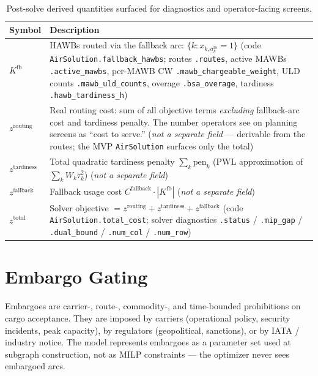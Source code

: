 \documentclass[11pt,a4paper]{article}
\theoremstyle{definition}
\begin{document}
\begin{table}[H]
\centering
\caption{Post-solve derived quantities surfaced for diagnostics and operator-facing screens.}
\label{tab:post-solve-derived}
\begin{tabular}{lp{11.5cm}}
\toprule
Symbol & Description \\
\midrule
$K^{\text{fb}}$ & HAWBs routed via the fallback arc: $\{k : x_{k, a^{\text{fb}}_k} = 1\}$ (code \texttt{AirSolution.fallback\_hawbs}; routes \texttt{.routes}, active MAWBs \texttt{.active\_mawbs}, per-MAWB CW \texttt{.mawb\_chargeable\_weight}, ULD counts \texttt{.mawb\_uld\_counts}, overage \texttt{.bsa\_overage}, tardiness \texttt{.hawb\_tardiness\_h}) \\
$z^{\text{routing}}$ & Real routing cost: sum of all objective terms \emph{excluding} fallback-arc cost and tardiness penalty. The number operators see on planning screens as ``cost to serve.'' (\emph{not a separate field} --- derivable from the routes; the MVP \texttt{AirSolution} surfaces only the total) \\
$z^{\text{tardiness}}$ & Total quadratic tardiness penalty $\sum_k \text{pen}_k$ (PWL approximation of $\sum_k W_k \tau_k^2$) (\emph{not a separate field}) \\
$z^{\text{fallback}}$ & Fallback usage cost $C^{\text{fallback}} \cdot |K^{\text{fb}}|$ (\emph{not a separate field}) \\
$z^{\text{total}}$ & Solver objective $= z^{\text{routing}} + z^{\text{tardiness}} + z^{\text{fallback}}$ (code \texttt{AirSolution.total\_cost}; solver diagnostics \texttt{.status} / \texttt{.mip\_gap} / \texttt{.dual\_bound} / \texttt{.num\_col} / \texttt{.num\_row}) \\
\bottomrule
\end{tabular}
\end{table}

\section{Embargo Gating}
\label{sec:embargo}

Embargoes are carrier-, route-, commodity-, and time-bounded prohibitions on
cargo acceptance. They are imposed by carriers (operational policy, security
incidents, peak capacity), by regulators (geopolitical, sanctions), or by
IATA / industry notice. The model represents embargoes as a parameter set
used at subgraph construction, not as MILP constraints --- the optimizer never
sees embargoed arcs.
\end{document}

